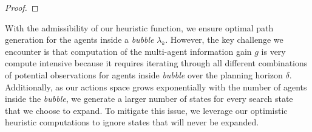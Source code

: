 \documentclass[letterpaper, 10 pt, conference]{IEEEConference}
\begin{document}
\begin{proof}



\end{proof}











With the admissibility of our heuristic function, we ensure optimal path generation for the agents inside a \textit{bubble} $\lambda_k$. However, the key challenge we encounter is that computation of the multi-agent information gain $g$ is very compute intensive because it requires iterating through all different combinations of potential observations for agents inside \textit{bubble} over the planning horizon $\delta$. Additionally, as our actions space grows exponentially with the number of agents inside the \textit{bubble}, we generate a larger number of states for every search state that we choose to expand. To mitigate this issue, we leverage our optimistic heuristic computations to ignore states that will never be expanded. 
\end{document}
